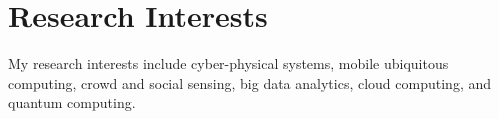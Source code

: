 
\section{\sc Research Interests}

My research interests include cyber-physical systems, mobile ubiquitous computing, crowd and social sensing, big data analytics, cloud computing, and quantum computing.



